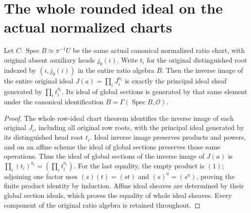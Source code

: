 \section{The whole rounded ideal on the actual normalized charts}

\begin{lemma}
\label{lem:kn-nadel-whole-rounded-root-chart-generator}
\leanok
{}
Let $C:\operatorname{Spec}B\simeq\pi^{-1}U$ be the same actual
canonical normalized ratio chart, with original absent auxiliary heads
$j_0(i)$. Write $t_i$ for the original distinguished root indexed by
$(i,j_0(i))$ in the entire ratio algebra $B$. Then the inverse image of
the entire original ideal $J(a)=\prod_iJ_i^{a_i}$ is exactly the
principal ideal sheaf generated by $\prod_i t_i^{a_i}$. Its ideal of
global sections is generated by that same element under the canonical
identification $B=\Gamma(\operatorname{Spec}B,\mathcal O)$.
\end{lemma}
\begin{proof}
The whole row-ideal chart theorem identifies the inverse image of each
original $J_i$, including all original row roots, with the principal
ideal generated by its distinguished head root $t_i$. Ideal inverse
image preserves products and powers, and on an affine scheme the ideal
of global sections preserves those same operations. Thus the ideal of
global sections of the inverse image of $J(a)$ is
$\prod_i(t_i)^{a_i}=(\prod_i t_i^{a_i})$.
For the last equality, the empty product is $(1)$; adjoining one factor
uses $(s)(t)=(st)$ and $(s)^a=(s^a)$, proving the finite product identity
by induction. Affine ideal sheaves are determined by their global
section ideals, which proves the equality of whole ideal sheaves.
Every component of the original ratio algebra is retained throughout.
\end{proof}
